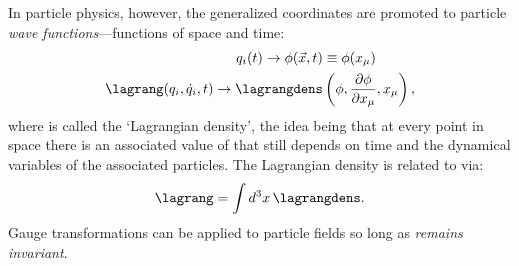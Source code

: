 In particle physics, however, the generalized coordinates are promoted to particle \emph{wave functions}---functions of space and time:
\begin{align*}
    q_i(t) \to \phi(\vec{x}, t) & \equiv \phi(x_\mu)
    \\
    \lagrang(q_i, \dot{q}_i, t) \to  \lagrangdens & \left( \phi, \frac{\partial \phi}{\partial x_\mu}, x_\mu \right),
\end{align*}
where \lagrangdens is called the `Lagrangian density',
the idea being that at every point in space there is an associated value of \lagrang that still depends on time and the dynamical variables of the associated particles.
The Lagrangian density is related to \lagrang via:
\begin{equation*}
    \lagrang = \int{d^3x \, \lagrangdens}.
\end{equation*}
Gauge transformations can be applied to particle fields so long as \lagrangdens \emph{remains invariant}.

